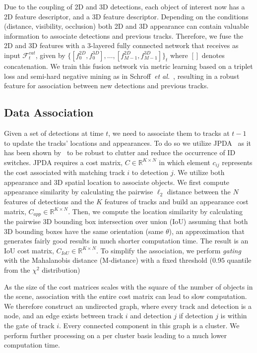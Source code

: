 \documentclass[letterpaper, 10 pt, conference]{ieeeconf}
\newcommand{\etal}{\emph{et al.}\xspace}
\begin{document}
Due to the coupling of 2D and 3D detections, each object of interest now has a 2D feature descriptor, and a 3D feature descriptor. Depending on the conditions (distance, visibility, occlusion) both 2D and 3D appearance can contain valuable information to associate detections and previous tracks. Therefore, we fuse the 2D and 3D features with a 3-layered fully connected network that receives as input $\mathcal{F}^{cat}_t$, given by $\{\left[f^{2D}_0, f^{3D}_{0}\right],\ldots,\left[f^{2D}_{M-1}, f^{3D}_{M-1}\right]\}_t$ where $\left[\right]$ denotes concatenation.
We train this fusion network via metric learning based on a triplet loss and semi-hard negative mining as in Schroff~\etal~\cite{schroff2015facenet}, resulting in a robust feature for association between new detections and previous tracks.


\subsection{Data Association}
\label{ss:da}



Given a set of detections at time $t$, we need to associate them to tracks at $t-1$ to update the tracks' locations and appearances. To do so we utilize JPDA~\cite{fortmann1983sonar} as it has been shown by~\cite{rezatofighiiccv2015} to be robust to clutter and reduce the occurrence of ID switches. JPDA requires a cost matrix, $C\in \mathbb{R}^{K\times N}$ in which element $c_{ij}$ represents the cost associated with matching track $i$  to detection $j$.
We utilize both appearance and 3D spatial location to associate objects. We first compute appearance similarity by calculating the pairwise $\ell_2$ distance between the $N$ features of detections and the $K$ features of tracks and build an appearance cost matrix, $C_{app}\in \mathbb{R}^{K\times N}$. Then, we compute the location similarity by calculating the pairwise 3D bounding box intersection over union (IoU) assuming that both 3D bounding boxes have the same orientation (same $\theta$), an approximation that generates fairly good results in much shorter computation time. The result is an IoU cost matrix, $C_{IoU}\in \mathbb{R}^{K\times N}$. To simplify the association, we perform \emph{gating} with the Mahalanobis distance (M-distance) with a fixed threshold ($0.95$ quantile from the $\chi^2$ distribution) 

As the size of the cost matrices scales with the square of the number of objects in the scene, association with the entire cost matrix can lead to slow computation. We therefore construct an undirected graph, where every track and detection is a node, and an edge exists between track $i$ and detection $j$ if detection $j$ is within the gate of track $i$. Every connected component in this graph is a cluster. We perform further processing on a per cluster basis leading to a much lower computation time.
\end{document}
